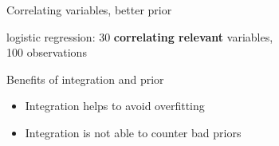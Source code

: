 \documentclass[english,t]{beamer}
\begin{document}
\begin{frame}{Correlating variables, better prior}

  logistic regression: 30 \textbf{correlating relevant} variables, \\100
  observations
  

\end{frame}

\begin{frame}{Benefits of integration and prior}

  \begin{itemize}
  \item Integration helps to avoid overfitting
  \item Integration is not able to counter bad priors
  \end{itemize}
  
\end{frame}
\end{document}
